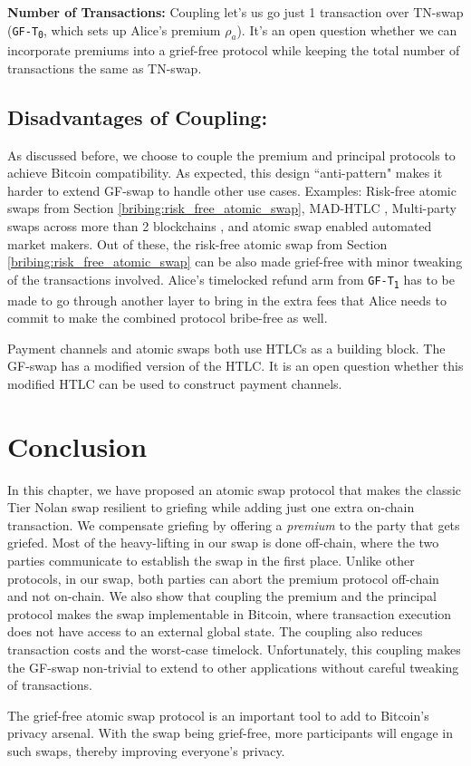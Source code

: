\bigbreak
\noindent
\textbf{Number of Transactions:} Coupling let's us go just 1 transaction over TN-swap (\texttt{GF-T\textsubscript{0}}, which sets up Alice's premium $\rho_a$). It's an open question whether we can incorporate premiums into a grief-free protocol while keeping the total number of transactions the same as TN-swap.

\subsection{Disadvantages of Coupling:} As discussed before, we choose to couple the premium and principal protocols to achieve Bitcoin compatibility. As expected, this design ``anti-pattern" makes it harder to extend GF-swap to handle other use cases. Examples: Risk-free atomic swaps from Section \ref{bribing:risk_free_atomic_swap}, MAD-HTLC \cite{mad_htlc}, Multi-party swaps across more than 2 blockchains \cite{herlihy2018atomic}, and atomic swap enabled automated market makers. Out of these, the risk-free atomic swap from Section \ref{bribing:risk_free_atomic_swap} can be also made grief-free with minor tweaking of the transactions involved. Alice's timelocked refund arm from \texttt{GF-T\textsubscript{1}} has to be made to go through another layer to bring in the extra fees that Alice needs to commit to make the combined protocol bribe-free as well. 

Payment channels and atomic swaps both use HTLCs as a building block. The GF-swap has a modified version of the HTLC. It is an open question whether this modified HTLC can be used to construct payment channels.

\section{Conclusion}
In this chapter, we have proposed an atomic swap protocol that makes the classic Tier Nolan swap resilient to griefing while adding just one extra on-chain transaction. We compensate griefing by offering a \textit{premium} to the party that gets griefed. Most of the heavy-lifting in our swap is done off-chain, where the two parties communicate to establish the swap in the first place. Unlike other protocols, in our swap, both parties can abort the premium protocol off-chain and not on-chain. We also show that coupling the premium and the principal protocol makes the swap implementable in Bitcoin, where transaction execution does not have access to an external global state. The coupling also reduces transaction costs and the worst-case timelock. Unfortunately, this coupling makes the GF-swap non-trivial to extend to other applications without careful tweaking of transactions.

The grief-free atomic swap protocol is an important tool to add to Bitcoin's privacy arsenal. With the swap being grief-free, more participants will engage in such swaps, thereby improving everyone's privacy.
